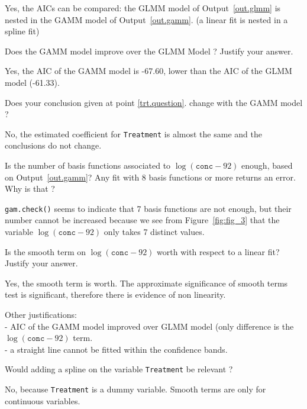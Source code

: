 \documentclass[11pt,a4paper%
addpoints, 
answers%
]{exam}
\begin{document}
\begin{questions}
\begin{solution}
Yes, the AICs can be compared: the GLMM model of Output~\ref{out.glmm} is nested in the GAMM model of Output~\ref{out.gamm}. (a linear fit is nested in a spline fit)
\end{solution}

\question[1]  Does the GAMM model improve over the GLMM Model ? Justify your answer.

\begin{solution}
Yes, the AIC of the GAMM model is -67.60, lower than the AIC of the GLMM model (-61.33).
\end{solution}

\question[1] Does your conclusion given at point \ref{trt.question}. change with the GAMM model ?

\begin{solution}
No, the estimated coefficient for \texttt{Treatment} is almost the same and the conclusions do not change.
\end{solution}

\question[2] Is the number of basis functions associated to $\log(\texttt{conc}-92)$ enough, based on Output~\ref{out.gamm}? Any fit with 8 basis functions or more returns an error. Why is that ?

\begin{solution}
\texttt{gam.check()} seems to indicate that 7 basis functions are not enough, but their number cannot be increased because we see from Figure~\ref{fig:fig_3} that the variable $\log(\texttt{conc}-92)$ only takes 7 distinct values.
\end{solution}



\question[2]  Is the smooth term on  $\log(\texttt{conc}-92)$  worth with respect to a linear fit? Justify your answer.

\begin{solution}
Yes, the smooth term is worth. The approximate significance of smooth terms test is significant, therefore there is evidence of non linearity. 

Other justifications:\\
- AIC of the GAMM model improved over GLMM model (only difference is the  $\log(\texttt{conc}-92)$  term.\\
- a straight line cannot be fitted within the confidence bands.
\end{solution}


\question[1] Would adding a spline on the variable \texttt{Treatment} be relevant ?
\begin{solution}
No, because  \texttt{Treatment} is a dummy variable. Smooth terms are only for continuous variables.
\end{solution}


\end{questions}
\end{document}
